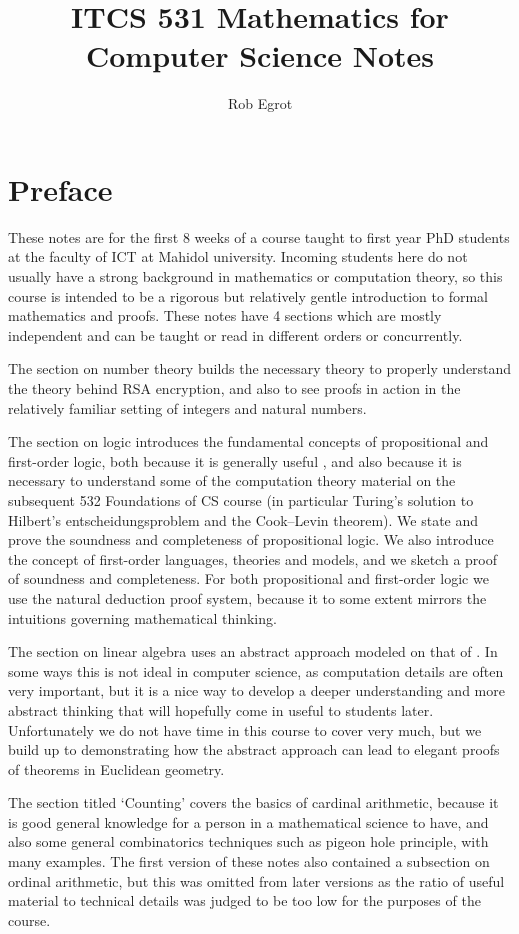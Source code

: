 \documentclass{article}
\title{ITCS 531 Mathematics for Computer Science Notes}
\author{Rob Egrot}
\date{}
\theoremstyle{plain}
\numberwithin{theorem}{subsection}
\begin{document}
\maketitle
\tableofcontents


\section{Preface}
These notes are for the first 8 weeks of a course taught to first year PhD students at the faculty of ICT at Mahidol university. Incoming students here do not usually have a strong background in mathematics or computation theory, so this course is intended to be a rigorous but relatively gentle introduction to formal mathematics and proofs. These notes have 4 sections which are mostly independent and can be taught or read in different orders or concurrently. 

The section on number theory builds the necessary theory to properly understand the theory behind RSA encryption, and also to see proofs in action in the relatively familiar setting of integers and natural numbers. 

The section on logic introduces the fundamental concepts of propositional and first-order logic, both because it is generally useful \cite{HHIKVV01}, and also because it is necessary to understand some of the computation theory material on the subsequent 532 Foundations of CS course (in particular Turing's solution to Hilbert's entscheidungsproblem and the Cook–Levin theorem). We state and prove the soundness and completeness of propositional logic. We also introduce the concept of first-order languages, theories and models, and we sketch a proof of soundness and completeness. For both propositional and first-order logic we use the natural deduction proof system, because it to some extent mirrors the intuitions governing mathematical thinking.

The section on linear algebra uses an abstract approach modeled on that of \cite{Ax15}. In some ways this is not ideal in computer science, as computation details are often very important, but it is a nice way to develop a deeper understanding and more abstract thinking that will hopefully come in useful to students later. Unfortunately we do not have time in this course to cover very much, but we build up to demonstrating how the abstract approach can lead to elegant proofs of theorems in Euclidean geometry.

The section titled `Counting' covers the basics of cardinal arithmetic, because it is good general knowledge for a person in a mathematical science to have, and also some general combinatorics techniques such as pigeon hole principle, with many examples. The first version of these notes also contained a subsection on ordinal arithmetic, but this was omitted from later versions as the ratio of useful material to technical details was judged to be too low for the purposes of the course.
\end{document}
